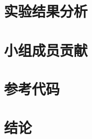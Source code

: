 \documentclass[journal,transmag]{IEEEtran}
\begin{document}
\section{实验结果分析}

\section{小组成员贡献}

\section{参考代码}

\section{结论}



%
%



%
%
\end{document}
